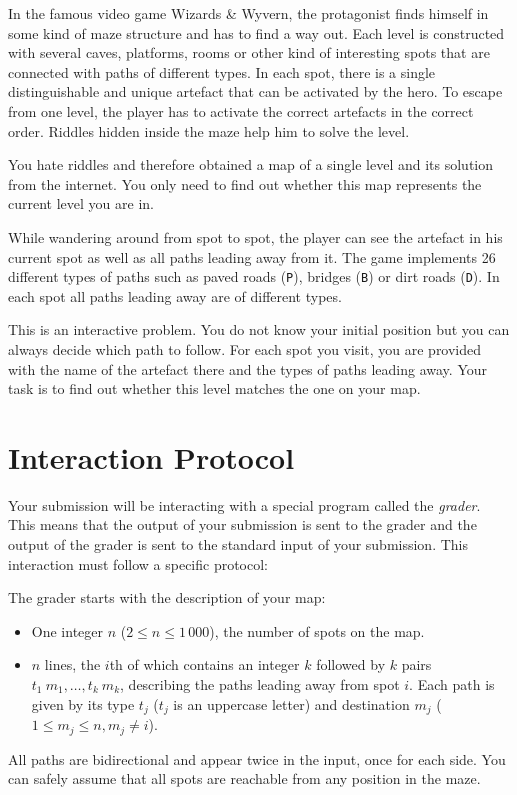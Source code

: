 
In the famous video game Wizards \& Wyvern, the protagonist finds himself in some kind of maze structure and has to find a way out.
Each level is constructed with several caves, platforms, rooms or other kind of interesting spots that are connected with paths of different types.
In each spot, there is a single distinguishable and unique artefact that can be activated by the hero.
To escape from one level, the player has to activate the correct artefacts in the correct order.
 Riddles hidden inside the maze help him to solve the level.

You hate riddles and therefore obtained a map of a single level and its solution from the internet.
You only need to find out whether this map represents the current level you are in.


While wandering around from spot to spot, the player can see the artefact in his current spot as well as all paths leading away from it.
The game implements 26 different types of paths such as paved roads (\texttt{P}), bridges (\texttt{B}) or dirt roads (\texttt{D}).
In each spot all paths leading away are of different types.

	

This is an interactive problem.
You do not know your initial position but you can always decide which path to follow. For each spot you visit, you are provided with the name of the artefact there and the types of paths leading away.
Your task is to find out whether this level matches the one on your map.
\vspace{-5mm}
\section*{Interaction Protocol}
\vspace{-2mm}
Your submission will be interacting with a special program called the \emph{grader}.
This means that the output of your submission is sent to the grader and the output of the grader is sent to the standard input of your submission.
This interaction must follow a specific protocol:


The grader starts with the description of your map:
\begin{itemize}
	\item One integer $n$ ($2 \le n \le 1\,000$), the number of spots on the map.
	\item $n$ lines, the $i$th of which contains an integer $k$ followed by $k$ pairs $t_1~m_1,\dots,t_k~m_k$, describing the paths leading away from spot $i$.
    Each path is given by its type $t_j$ ($t_j$ is an uppercase letter) and destination $m_j$ ($1\le m_j\le n, m_j \ne i$).
\end{itemize}
All paths are bidirectional and appear twice in the input, once for each side.
You can safely assume that all spots are reachable from any position in the maze.

